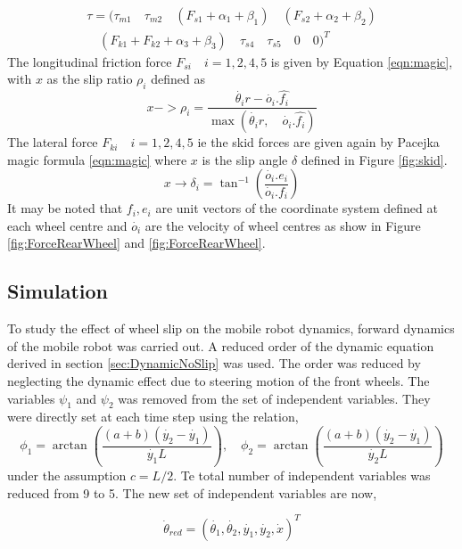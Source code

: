 {\begin{multline}
\tau=(
\tau_{m1} \quad \tau_{m2} \quad (F_{s1}+\alpha_1+\beta_1) \quad( F_{s2}+\alpha_2+\beta_2) \\
 \quad  (F_{k1}+ F_{k2}+\alpha_3+\beta_3)\quad \tau_{s4}\quad  \tau_{s5} \quad 0 \quad 0 )  ^T
\end{multline}
The longitudinal  friction force $F_{si} \quad i=1,2,4,5 $ is given by Equation \ref{eqn:magic}, with $ x $ as the slip ratio $\rho_i$ defined as
\[
x->\rho_i = \frac{\dot{\theta_i} r - \dot{o_i}.\hat{f_i}}{\max(\dot{\theta_i} r,\quad \dot{o_i}.\hat{f_i})}
\]
The lateral force  $F_{ki} \quad i=1,2,4,5 $ ie the skid forces are given again by Pacejka magic formula \ref{eqn:magic} where $x$ is the slip angle $\delta$ defined in Figure \ref{fig:skid}. 
\[
x \rightarrow \delta_i=\tan^{-1}(\frac{\dot{o_i}.e_i}{\dot{o_i}.f_i})
\]
It may be noted that $f_i,e_i$ are unit vectors of the coordinate system defined at each wheel centre and $\dot{o_i}$ are the velocity of wheel centres as show in Figure  \ref{fig:ForceRearWheel} and \ref{fig:ForceRearWheel}.
\subsection{Simulation}
To study the effect of wheel slip on the mobile robot dynamics, forward dynamics of the mobile robot was carried out. 
A reduced order  of the dynamic  equation derived in section \ref{sec:DynamicNoSlip} was used.
 The order was reduced by  neglecting the dynamic effect due to steering motion of the front wheels. The  variables $\psi_1$ and $\psi_2$ was  removed  from the  set of independent variables. They were directly set  at each time step using the relation,
 \[\phi_1=\arctan\left( \frac{(a+b)(\dot{y_2}-\dot{y_1})}{\dot{y_1}L}\right) , \quad
 \phi_2=\arctan\left( \frac{(a+b)(\dot{y_2}-\dot{y_1})}{\dot{y_2}L  }\right) 
 \]
  under the assumption $c=L/2$.
Te total number of independent variables  was  reduced from  9 to 5. The new set of independent variables are now,

\begin{equation}
\label{eqn:theta_slip_reduced}
\dot{\theta}_{red}=(\dot{\theta_1},\dot{\theta_2}, \dot{y_1},\dot{y_2},\dot{x})^T
\end{equation} 

}
